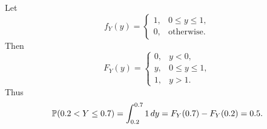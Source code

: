 \begin{example}
Let
\[
  f_Y(y)=
  \begin{cases}
    1, & 0\le y\le1,\\
    0, & \text{otherwise}.
  \end{cases}
\]
Then
\[
  F_Y(y)=
  \begin{cases}
    0, & y<0,\\
    y, & 0\le y\le1,\\
    1, & y>1.
  \end{cases}
\]
Thus
\[
  \mathbb{P}(0.2<Y\le0.7)
  =\int_{0.2}^{0.7}1\,dy
  =F_Y(0.7)-F_Y(0.2)=0.5.
\]
\end{example}
